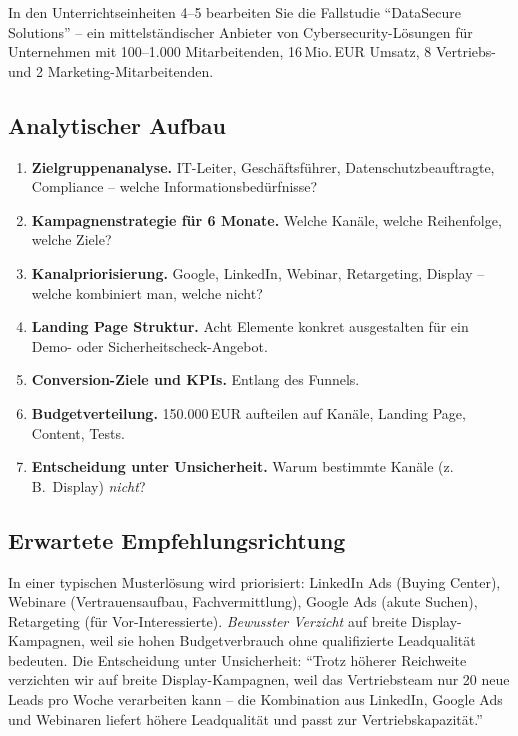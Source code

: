 \documentclass[11pt,a4paper,oneside]{article}
\begin{document}
In den Unterrichtseinheiten 4--5 bearbeiten Sie die Fallstudie ``DataSecure Solutions'' -- ein mittelständischer Anbieter von Cybersecurity-Lösungen für Unternehmen mit 100--1.000 Mitarbeitenden, 16\,Mio.\,EUR Umsatz, 8 Vertriebs- und 2 Marketing-Mitarbeitenden.

\subsection{Analytischer Aufbau}

\begin{enumerate}
  \item \textbf{Zielgruppenanalyse.} IT-Leiter, Geschäftsführer, Datenschutzbeauftragte, Compliance -- welche Informationsbedürfnisse?
  \item \textbf{Kampagnenstrategie für 6 Monate.} Welche Kanäle, welche Reihenfolge, welche Ziele?
  \item \textbf{Kanalpriorisierung.} Google, LinkedIn, Webinar, Retargeting, Display -- welche kombiniert man, welche nicht?
  \item \textbf{Landing Page Struktur.} Acht Elemente konkret ausgestalten für ein Demo- oder Sicherheitscheck-Angebot.
  \item \textbf{Conversion-Ziele und KPIs.} Entlang des Funnels.
  \item \textbf{Budgetverteilung.} 150.000\,EUR aufteilen auf Kanäle, Landing Page, Content, Tests.
  \item \textbf{Entscheidung unter Unsicherheit.} Warum bestimmte Kanäle (z.\,B.\ Display) \emph{nicht}?
\end{enumerate}

\subsection{Erwartete Empfehlungsrichtung}

In einer typischen Musterlösung wird priorisiert: LinkedIn Ads (Buying Center), Webinare (Vertrauensaufbau, Fachvermittlung), Google Ads (akute Suchen), Retargeting (für Vor-Interessierte). \emph{Bewusster Verzicht} auf breite Display-Kampagnen, weil sie hohen Budgetverbrauch ohne qualifizierte Leadqualität bedeuten. Die Entscheidung unter Unsicherheit: ``Trotz höherer Reichweite verzichten wir auf breite Display-Kampagnen, weil das Vertriebsteam nur 20 neue Leads pro Woche verarbeiten kann -- die Kombination aus LinkedIn, Google Ads und Webinaren liefert höhere Leadqualität und passt zur Vertriebskapazität.''
\end{document}
